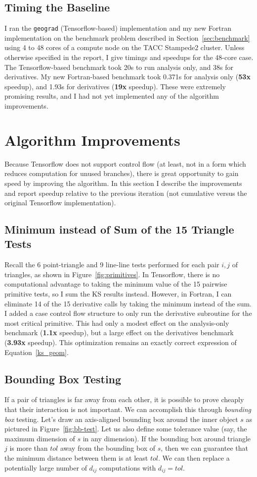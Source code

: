 \documentclass[11pt,letterpaper]{article}
\begin{document}
\subsection{Timing the Baseline}
I ran the \texttt{geograd} (Tensorflow-based) implementation and my new Fortran implementation on the benchmark problem described in Section~\ref{sec:benchmark} using 4 to 48 cores of a compute node on the TACC Stampede2 cluster.
Unless otherwise specified in the report, I give timings and speedups for the 48-core case.
The Tensorflow-based benchmark took 20s to run analysis only, and 38s for derivatives.
My new Fortran-based benchmark took 0.371s for analysis only (\textbf{53x} speedup), and 1.93s for derivatives (\textbf{19x} speedup).
These were extremely promising results, and I had not yet implemented any of the algorithm improvements.

\section{Algorithm Improvements}
Because Tensorflow does not support control flow (at least, not in a form which reduces computation for unused branches), there is great opportunity to gain speed by improving the algorithm.
In this section I describe the improvements and report speedup relative to the previous iteration (not cumulative versus the original Tensorflow implementation).

\subsection{Minimum instead of Sum of the 15 Triangle Tests}
Recall the 6 point-triangle and 9 line-line tests performed for each pair $i,j$ of triangles, as shown in Figure~\ref{fig:primitives}.
In Tensorflow, there is no computational advantage to taking the minimum value of the 15 pairwise primitive tests, so I sum the KS results instead.
However, in Fortran, I can eliminate 14 of the 15 derivative calls by taking the minimum instead of the sum.
I added a case control flow structure to only run the derivative subroutine for the most critical primitive.
This had only a modest effect on the analysis-only benchmark (\textbf{1.1x} speedup), but a large effect on the derivatives benchmark (\textbf{3.93x} speedup).
This optimization remains an exactly correct expression of Equation~\ref{ks_geom}.

\subsection{Bounding Box Testing}
If a pair of triangles is far away from each other, it is possible to prove cheaply that their interaction is not important.
We can accomplish this through \emph{bounding box} testing.
Let's draw an axis-aligned bounding box around the inner object $s$ as pictured in Figure~\ref{fig:bb-test}.
Let us also define some tolerance value (say, the maximum dimension of $s$ in any dimension).
If the bounding box around triangle $j$ is more than $tol$ away from the bounding box of $s$, then we can guarantee that the minimum distance between them is at least $tol$.
We can then replace a potentially large number of $d_{ij}$ computations with $d_{ij}=tol$.
\end{document}
